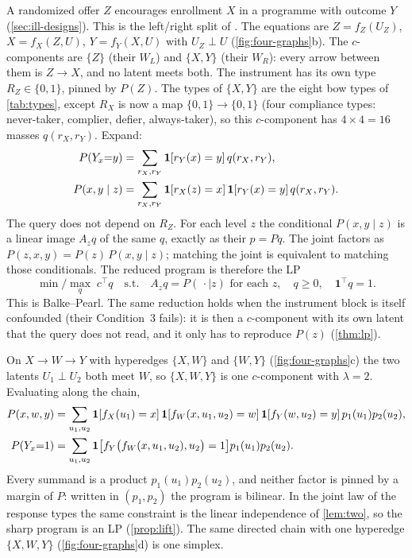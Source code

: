 \begin{example}
\label{ex:iv-lp}
A randomized offer $Z$ encourages enrollment $X$ in a programme with outcome
$Y$ (\cref{sec:ill-designs}). This is the left/right split of
\citet[Proposition~2]{symbolicbounds2023general}.
The equations are $Z=f_Z(U_Z)$, $X=f_X(Z,U)$, $Y=f_Y(X,U)$ with
$U_Z\perp U$ (\cref{fig:four-graphs}b). The $c$-components are $\{Z\}$
(their $W_L$) and $\{X,Y\}$ (their $W_R$): every arrow between them is
$Z\to X$, and no latent meets both. The
instrument has its own type $R_Z\in\{0,1\}$, pinned by $P(Z)$. The
types of $\{X,Y\}$ are the eight bow types of \cref{tab:types}, except
$R_X$ is now a map $\{0,1\}\to\{0,1\}$ (four compliance types:
never-taker, complier, defier, always-taker), so this $c$-component has
$4\times 4=16$ masses $q(r_X,r_Y)$. Expand:
\begin{align}
\label{eq:iv-exp}
P(Y_x{=}y)
&=
\sum_{r_X,r_Y}
\mathbf{1}[r_Y(x)=y]\,q(r_X,r_Y),
\\
P(x,y\mid z)
&=
\sum_{r_X,r_Y}
\mathbf{1}[r_X(z)=x]\,\mathbf{1}[r_Y(x)=y]\,q(r_X,r_Y).
\nonumber
\end{align}
The query does not depend on $R_Z$. For each level $z$ the conditional
$P(x,y\mid z)$ is a linear image $A_z q$ of the same $q$, exactly as
their $p=Pq$. The joint factors as
$P(z,x,y)=P(z)\,P(x,y\mid z)$; matching the joint is equivalent to
matching those conditionals. The reduced program is therefore the LP
\begin{equation}
\label{eq:iv-lp}
\min/\max_q\;
c^\top q
\quad\text{s.t.}\quad
A_z q=P(\,\cdot\mid z)
\text{ for each }z,\quad
q\ge 0,\quad
\mathbf{1}^\top q=1.
\end{equation}
This is Balke--Pearl. The same reduction holds when the instrument block is
itself confounded (their Condition~3 fails): it is then a $c$-component with
its own latent that the query does not read, and it only has to reproduce
$P(z)$ (\cref{thm:lp}).
\end{example}

\begin{example}
\label{ex:pair}
On $X\to W\to Y$ with hyperedges $\{X,W\}$ and $\{W,Y\}$
(\cref{fig:four-graphs}c) the two latents $U_1\perp U_2$ both meet $W$, so
$\{X,W,Y\}$ is one $c$-component with $\lambda=2$. Evaluating along the
chain,
\begin{align}
\label{eq:pair}
P(x,w,y)
&=
\sum_{u_1,u_2}
\mathbf{1}[f_X(u_1)=x]\,
\mathbf{1}[f_W(x,u_1,u_2)=w]\,
\mathbf{1}[f_Y(w,u_2)=y]\,
p_1(u_1)p_2(u_2),
\\
P(Y_x{=}1)
&=
\sum_{u_1,u_2}
\mathbf{1}\bigl[f_Y\bigl(f_W(x,u_1,u_2),u_2\bigr)=1\bigr]
p_1(u_1)p_2(u_2).
\nonumber
\end{align}
Every summand is a product $p_1(u_1)p_2(u_2)$, and neither factor is
pinned by a margin of $P$: written in $(p_1,p_2)$ the program is bilinear.
In the joint law of the response types the same constraint is the linear
independence of \cref{lem:two}, so the sharp program is an LP
(\cref{prop:lift}). The same directed chain with one hyperedge
$\{X,W,Y\}$ (\cref{fig:four-graphs}d) is one simplex.
\end{example}


